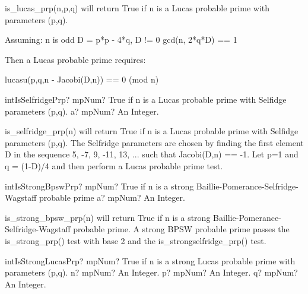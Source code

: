 \vspace{0.3cm}

is\_lucas\_prp(n,p,q) will return True if n is a Lucas probable prime with parameters (p,q).

Assuming:
n is odd
D = p*p - 4*q, D != 0
gcd(n, 2*q*D) == 1

Then a Lucas probable prime requires:

lucasu(p,q,n - Jacobi(D,n)) == 0 (mod n)



\vspace{0.6cm}
\begin{mpFunctionsExtract}
	\mpFunctionOne
	{intIsSelfridgePrp? mpNum? True if n is a Lucas probable prime with Selfidge parameters (p,q).}
	{a? mpNum? An Integer.}
\end{mpFunctionsExtract}

\vspace{0.3cm}

is\_selfridge\_prp(n) will return True if n is a Lucas probable prime with Selfidge parameters
(p,q). The Selfridge parameters are chosen by finding the first element D in the sequence {5,
	-7, 9, -11, 13, ...} such that Jacobi(D,n) == -1. Let p=1 and q = (1-D)/4 and then perform a
Lucas probable prime test.



\vspace{0.6cm}
\begin{mpFunctionsExtract}
	\mpFunctionOne
	{intIsStrongBpswPrp? mpNum? True if n is a strong Baillie-Pomerance-Selfridge-Wagstaff probable prime}
	{a? mpNum? An Integer.}
\end{mpFunctionsExtract}

\vspace{0.3cm}

is\_strong\_bpsw\_prp(n) will return True if n is a strong Baillie-Pomerance-Selfridge-Wagstaff
probable prime. A strong BPSW probable prime passes the is\_strong\_prp() test with base 2
and the is\_strongselfridge\_prp() test.



\vspace{0.6cm}
\begin{mpFunctionsExtract}
	\mpFunctionThree
	{intIsStrongLucasPrp? mpNum? True if n is a strong Lucas probable prime with parameters (p,q).}
	{n? mpNum? An Integer.}
	{p? mpNum? An Integer.}
	{q? mpNum? An Integer.}
\end{mpFunctionsExtract}

\vspace{0.3cm}

